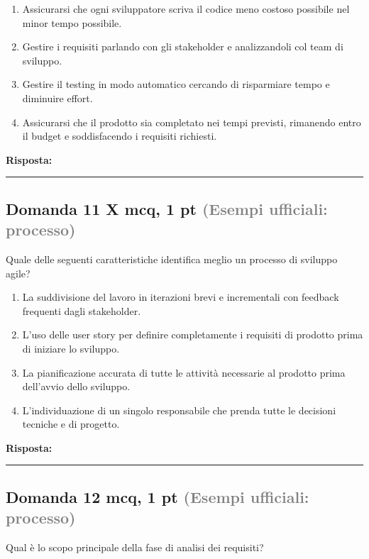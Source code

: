 \documentclass[a4paper,11pt]{article}
\begin{document}
\begin{enumerate}[label=\alph*)]
\item Assicurarsi che ogni sviluppatore scriva il codice meno costoso possibile nel minor tempo possibile.
\item Gestire i requisiti parlando con gli stakeholder e analizzandoli col team di sviluppo.
\item Gestire il testing in modo automatico cercando di risparmiare tempo e diminuire effort.
\item Assicurarsi che il prodotto sia completato nei tempi previsti, rimanendo entro il budget e soddisfacendo i requisiti richiesti.
\end{enumerate}
\vspace{0.2cm}
\noindent\textbf{Risposta:}\par
\vspace{1.5cm}\hrule


\subsection*{Domanda 11 X \hfill {\small mcq, 1 pt \textcolor{gray}{(Esempi ufficiali: processo)}}}
Quale delle seguenti caratteristiche identifica meglio un processo di sviluppo agile?

\begin{enumerate}[label=\alph*)]
\item La suddivisione del lavoro in iterazioni brevi e incrementali con feedback frequenti dagli stakeholder.
\item L'uso delle user story per definire completamente i requisiti di prodotto prima di iniziare lo sviluppo.
\item La pianificazione accurata di tutte le attività necessarie al prodotto prima dell'avvio dello sviluppo.
\item L'individuazione di un singolo responsabile che prenda tutte le decisioni tecniche e di progetto.
\end{enumerate}
\vspace{0.2cm}
\noindent\textbf{Risposta:}\par
\vspace{1.5cm}\hrule


\subsection*{Domanda 12 \hfill {\small mcq, 1 pt \textcolor{gray}{(Esempi ufficiali: processo)}}}
Qual è lo scopo principale della fase di analisi dei requisiti?
\end{document}
